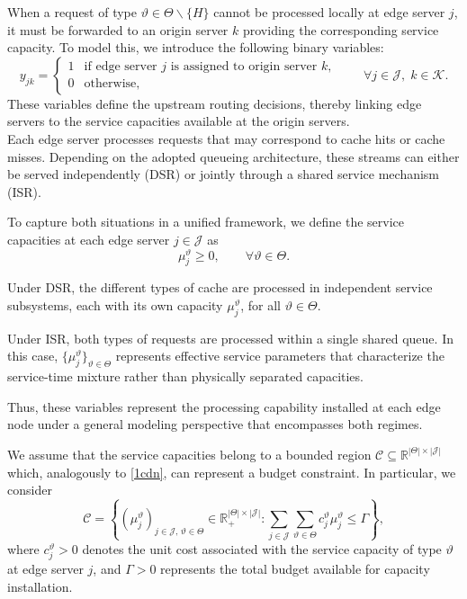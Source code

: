 \documentclass[a4paper,11pt,reqno]{amsart}
\newcommand{\R}{\mathbb{R}}
\newcommand{\K}{\mathcal{K}}
\newcommand{\J}{\mathcal{J}}
\begin{document}
 When a request of type $\vartheta \in \Theta\backslash\{H\}$ cannot be processed locally at edge server $j$, it must be forwarded to an origin server $k$ providing the corresponding service capacity. To model this, we introduce the following binary variables:
\begin{equation}\label{eq:y-alloc}
y_{jk} =
\begin{cases}
1 & \text{if edge server $j$ is assigned to origin server $k$},\\
0 & \text{otherwise},
\end{cases}
\qquad \forall j \in \J,\; k \in \K.
\end{equation}
These variables define the upstream routing decisions, thereby linking edge servers to the service capacities available at the origin servers.\\

 Each edge server processes requests that may correspond to cache hits or cache misses. Depending on the adopted queueing architecture, these streams can either be served independently (DSR) or jointly through a shared service mechanism (ISR).

To capture both situations in a unified framework, we define the service capacities at each edge server $j \in \J$ as
$$
\mu_j^\vartheta \ge 0, \qquad \forall \vartheta \in \Theta.
$$

Under DSR, the different types of cache are processed in independent service subsystems, each with its own capacity $\mu_j^\vartheta$, for all $\vartheta \in \Theta$.

Under ISR, both types of requests are processed within a single shared queue. In this case, $\{\mu_j^\vartheta\}_{\vartheta \in \Theta}$  represents effective service parameters that characterize the service-time mixture rather than physically separated capacities.


Thus, these variables represent the processing capability installed at each edge node under a general modeling perspective that encompasses both regimes.

We assume that the service capacities belong to a bounded region $\mathcal{C} \subseteq \R^{|\Theta|\times |\J|}$ which, analogously to \eqref{1cdn}, can represent a budget constraint. In particular, we consider
$$
\mathcal{C} = \left\{(\mu_j^\vartheta)_{j\in \J,\, \vartheta\in \Theta} \in \R^{|\Theta|\times |\J|}_+ :
\sum_{j\in \J} \sum_{\vartheta\in \Theta} c_j^\vartheta \mu_j^\vartheta \leq \Gamma \right\},
$$
where $c_j^\vartheta >0$ denotes the unit cost associated with the service capacity of type $\vartheta$ at edge server $j$, and $\Gamma>0$ represents the total budget available for capacity installation.
\end{document}
